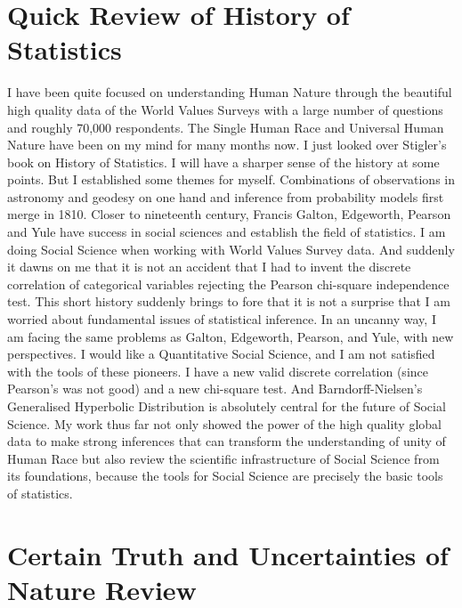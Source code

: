 \documentclass{amsart}
\begin{document}
\section{Quick Review of History of Statistics}

I have been quite focused on understanding Human Nature through the beautiful high quality data of the World Values Surveys with a large number of questions and roughly 70,000 respondents.  The Single Human Race and Universal Human Nature have been on my mind for many months now.  I just looked over Stigler's book on History of Statistics.  I will have a sharper sense of the history at some points.  But I established some themes for myself.  Combinations of observations in astronomy and geodesy on one hand and inference from probability models first merge in 1810.  Closer to nineteenth century, Francis Galton, Edgeworth, Pearson and Yule have success in social sciences and establish the field of statistics.  I am doing Social Science when working with World Values Survey data.  And suddenly it dawns on me that it is not an accident that I had to invent the discrete correlation of categorical variables rejecting the Pearson chi-square independence test. This short history suddenly brings to fore that it is not a surprise that I am worried about fundamental issues of statistical inference.  In an uncanny way, I am facing the same problems as Galton, Edgeworth, Pearson, and Yule, with new perspectives.  I would like a Quantitative Social Science, and I am not satisfied with the tools of these pioneers.  I have a new valid discrete correlation (since Pearson's was not good) and a new chi-square test.  And Barndorff-Nielsen's Generalised Hyperbolic Distribution is absolutely central for the future of Social Science.  My work thus far not only showed the power of the high quality global data to make strong inferences that can transform the understanding of unity of Human Race but also review the scientific infrastructure of Social Science from its foundations, because the tools for Social Science are precisely the basic tools of statistics.

\section{Certain Truth and Uncertainties of Nature Review}
\end{document}
